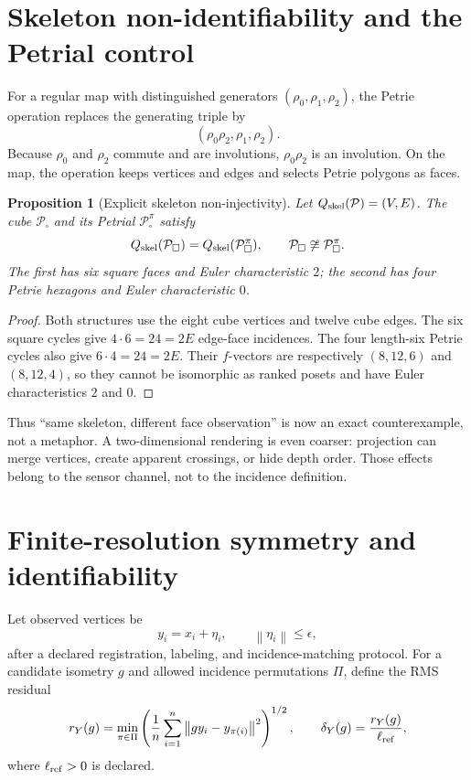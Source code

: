 \documentclass[11pt,a4paper]{article}
\theoremstyle{definition}
\theoremstyle{plain}
\newtheorem{proposition}[definition]{Proposition}
\theoremstyle{remark}
\newcommand{\norm}[1]{\left\lVert #1\right\rVert}
\newcommand{\Pcal}{\mathcal P}
\begin{document}
\section{Skeleton non-identifiability and the Petrial control}

For a regular map with distinguished generators
\((\rho_0,\rho_1,\rho_2)\), the Petrie operation replaces the
generating triple by
\begin{equation}\label{eq:petrie-generators}
(\rho_0\rho_2,\rho_1,\rho_2).
\end{equation}
Because \(\rho_0\) and \(\rho_2\) commute and are involutions,
\(\rho_0\rho_2\) is an involution.  On the map, the operation keeps
vertices and edges and selects Petrie polygons as faces.

\begin{proposition}[Explicit skeleton non-injectivity]
\label{prop:petrial}
Let \(Q_{\rm skel}(\Pcal)=(V,E)\).  The cube \(\Pcal_\square\) and its
Petrial \(\Pcal_\square^\pi\) satisfy
\[
Q_{\rm skel}(\Pcal_\square)
=Q_{\rm skel}(\Pcal_\square^\pi),
\qquad
\Pcal_\square\not\cong\Pcal_\square^\pi.
\]
The first has six square faces and Euler characteristic \(2\); the
second has four Petrie hexagons and Euler characteristic \(0\).
\end{proposition}

\begin{proof}
Both structures use the eight cube vertices and twelve cube edges.
The six square cycles give \(4\cdot6=24=2E\) edge-face incidences.
The four length-six Petrie cycles also give
\(6\cdot4=24=2E\).  Their \(f\)-vectors are respectively
\((8,12,6)\) and \((8,12,4)\), so they cannot be isomorphic as ranked
posets and have Euler characteristics \(2\) and \(0\).
\end{proof}

Thus ``same skeleton, different face observation'' is now an exact
counterexample, not a metaphor.  A two-dimensional rendering is even
coarser: projection can merge vertices, create apparent crossings,
or hide depth order.  Those effects belong to the sensor channel,
not to the incidence definition.

\section{Finite-resolution symmetry and identifiability}

Let observed vertices be
\[
y_i=x_i+\eta_i,\qquad \norm{\eta_i}\le\epsilon,
\]
after a declared registration, labeling, and incidence-matching
protocol.  For a candidate isometry \(g\) and allowed incidence
permutations \(\Pi\), define the RMS residual
\begin{equation}\label{eq:residual}
r_Y(g)=
\min_{\pi\in\Pi}
\left(\frac1n\sum_{i=1}^n
\norm{g y_i-y_{\pi(i)}}^2\right)^{1/2},
\qquad
\delta_Y(g)=\frac{r_Y(g)}{\ell_{\rm ref}},
\end{equation}
where \(\ell_{\rm ref}>0\) is declared.
\end{document}
